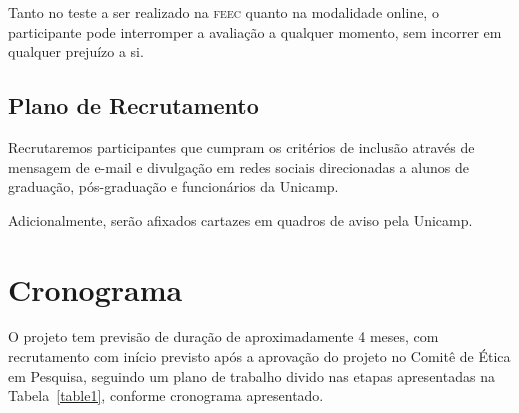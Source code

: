 \documentclass[a4paper,11pt,titlepage,singlespacing]{article}
\newcommand\todo[1]{\textcolor{red}{#1}}
\begin{document}
Tanto no teste a ser realizado na \textsc{feec} quanto na modalidade online, o participante pode interromper a avaliação a qualquer momento, sem incorrer em qualquer prejuízo a si.






\subsection{Plano de Recrutamento}

\noindent Recrutaremos participantes que cumpram os critérios de inclusão através de mensagem de e-mail e divulgação em redes sociais direcionadas a alunos de graduação, pós-graduação e funcionários da Unicamp.

Adicionalmente, serão afixados cartazes em quadros de aviso pela Unicamp.

\section{Cronograma}
\noindent O projeto tem previsão de duração de aproximadamente 4 meses, com recrutamento com início previsto após a aprovação do projeto no Comitê de Ética em Pesquisa, seguindo um plano de trabalho divido nas etapas apresentadas na Tabela~\ref{table1}, conforme cronograma apresentado.
\end{document}
